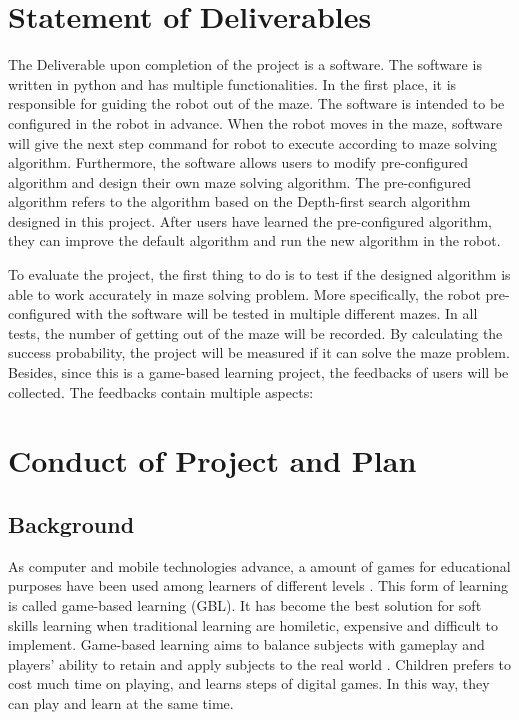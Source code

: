 \documentclass[11pt,times,oneside,openright,hardcopy]{eeereport}
\begin{document}
\section{Statement of Deliverables}
The Deliverable upon completion of the project is a software. The software is written in python and has multiple functionalities. In the first place, it is responsible for guiding the robot out of the maze.
The software is intended to be configured in the robot in advance. When the robot moves in the maze, software will give the next step command for robot to execute according to maze solving algorithm.
Furthermore, the software allows users to modify pre-configured algorithm and design their own maze solving algorithm. The pre-configured algorithm refers to the algorithm based on the Depth-first search algorithm designed in this project.
After users have learned the pre-configured algorithm, they can improve the default algorithm and run the new algorithm in the robot.

To evaluate the project, the first thing to do is to test if the designed algorithm is able to work accurately in maze solving problem. More specifically, the robot pre-configured with the software will be tested in multiple different mazes.
In all tests, the number of getting out of the maze will be recorded. By calculating the success probability, the project will be measured if it can solve the maze problem.
Besides, since this is a game-based learning project, the feedbacks of users will be collected. The feedbacks contain multiple aspects:


\section{Conduct of Project and Plan}
\subsection{Background}
As computer and mobile technologies advance, a amount of games for educational purposes have been used among learners of different levels \cite{Proulx:2018fr}. This form of learning is called game-based learning (GBL). It has become the best solution for soft skills learning when traditional learning are homiletic, expensive and difficult to implement.
Game-based learning aims to balance subjects with gameplay and players' ability to retain and apply subjects to the real world \cite{Ifenthaler:2012tn}. Children prefers to cost much time on playing, and learns steps of digital games. In this way, they can play and learn at the same time.
\end{document}
